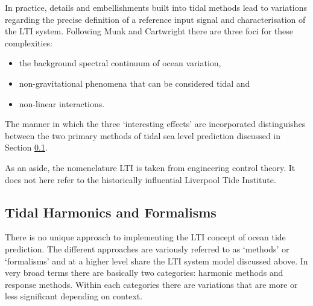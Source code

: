 In practice, details and embellishments built into tidal methods lead to variations regarding the precise definition of a reference input signal and characterisation of the LTI system.   Following Munk and Cartwright \citep{Munk:1966ts} there are three foci for these complexities:
\begin{itemize}
\item the background spectral continuum of ocean variation, 
\item non-gravitational phenomena that can be considered tidal and 
\item non-linear interactions.   
\end{itemize}
The manner in which the three `interesting effects' are incorporated distinguishes between the two primary methods of tidal sea level prediction discussed in Section \ref{S:formalisms}.



As an aside, the nomenclature LTI is taken from engineering control theory.   It does not here refer to the historically influential Liverpool Tide Institute.


\subsection{Tidal Harmonics and Formalisms}
\label{S:formalisms}

There is no unique approach to implementing the LTI concept of ocean tide prediction.   The different approaches are variously referred to as `methods' or `formalisms' and at a higher level share the LTI system model discussed above.  In very broad terms there are basically two categories: harmonic methods and response methods.   Within each categories there are variations that are more or less significant depending on context. 




